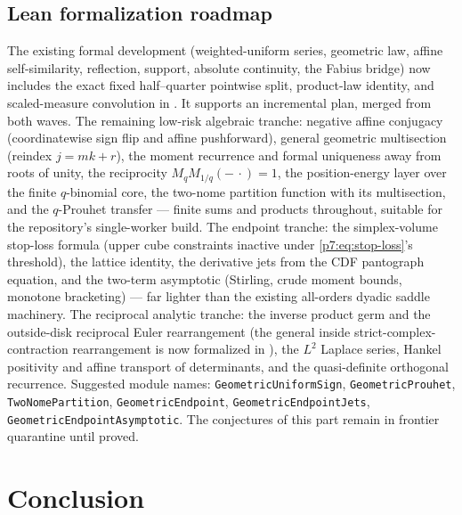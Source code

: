 \documentclass[11pt,oneside]{article}
\numberwithin{equation}{section}
\theoremstyle{definition}
\theoremstyle{remark}
\begin{document}
\subsection{Lean formalization roadmap}

The existing formal development (weighted-uniform series, geometric law,
affine self-similarity, reflection, support, absolute continuity, the Fabius
bridge) now includes the exact fixed half--quarter pointwise split, product-law
identity, and scaled-measure convolution in
.  It supports an incremental plan,
merged from both waves.  The remaining low-risk algebraic tranche: negative
affine conjugacy (coordinatewise sign flip and affine pushforward), general
geometric multisection (reindex $j=mk+r$), the moment
recurrence and formal uniqueness away from roots of unity, the reciprocity
$M_qM_{1/q}(-\,\cdot)=1$, the position-energy layer over the finite
$q$-binomial core, the two-nome partition function with its multisection, and
the $q$-Prouhet transfer --- finite sums and products throughout, suitable
for the repository's single-worker build.  The endpoint tranche: the
simplex-volume stop-loss formula (upper cube constraints inactive under
\eqref{p7:eq:stop-loss}'s threshold), the lattice identity, the derivative
jets from the CDF pantograph equation, and the two-term asymptotic
(Stirling, crude moment bounds, monotone bracketing) --- far lighter than the
existing all-orders dyadic saddle machinery.  The reciprocal analytic
tranche: the inverse product germ and the outside-disk reciprocal Euler
rearrangement (the general inside strict-complex-contraction rearrangement is
now formalized in ), the $L^2$ Laplace
series, Hankel positivity and affine transport of determinants, and the
quasi-definite orthogonal recurrence.  Suggested module names:
\texttt{GeometricUniformSign}, \texttt{GeometricProuhet}, \texttt{TwoNomePartition},
\texttt{GeometricEndpoint}, \texttt{GeometricEndpointJets},
\texttt{GeometricEndpointAsymptotic}.  The conjectures of this part remain in
frontier quarantine until proved.

\section{Conclusion}
\end{document}
